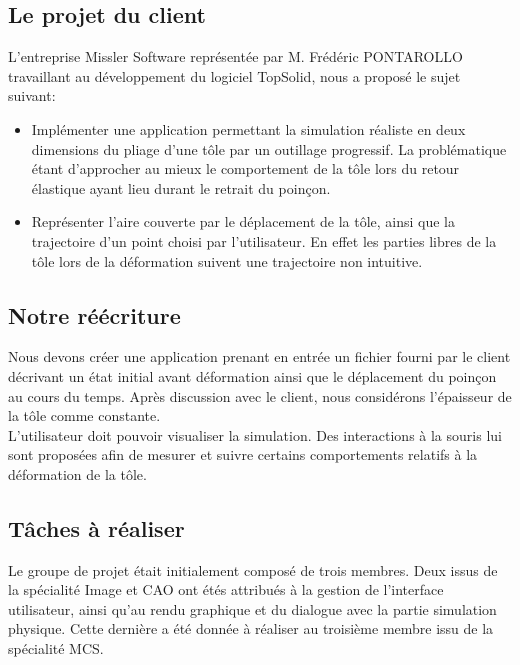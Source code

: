 \documentclass[a4paper, 11pt]{article}
\begin{document}
\subsection{Le projet du client}
L'entreprise Missler Software  représentée par M. Frédéric PONTAROLLO travaillant au développement du logiciel TopSolid, nous a proposé le sujet suivant:
\begin{itemize}
        \renewcommand{\labelitemi}{$\bullet$}
    \item Implémenter une application permettant la simulation réaliste en deux dimensions du pliage d'une tôle par un outillage progressif.
La problématique étant d'approcher au mieux le comportement de la tôle lors du retour élastique ayant lieu durant le retrait du poinçon.
    \item Représenter l'aire couverte par le déplacement de la tôle, ainsi que la trajectoire d'un point choisi par l'utilisateur.
En effet les parties libres de la tôle lors de la déformation suivent une trajectoire non intuitive.
\end{itemize}

\subsection{Notre réécriture}
Nous devons créer une application prenant en entrée un fichier fourni par le client décrivant un état initial avant déformation ainsi que le déplacement du poinçon au cours du temps. Après discussion avec le client, nous considérons l'épaisseur de la tôle comme constante.\\
L'utilisateur doit pouvoir visualiser la simulation. Des interactions à la souris lui sont proposées afin de mesurer et suivre certains comportements relatifs à la déformation de la tôle.

\subsection{Tâches à réaliser}
Le groupe de projet était initialement composé de trois membres.
Deux issus de la spécialité Image et CAO ont étés attribués à la gestion de l'interface utilisateur, ainsi qu'au rendu graphique et du dialogue avec la partie simulation physique.
Cette dernière a été donnée à réaliser au troisième membre issu de la spécialité MCS.
\end{document}
